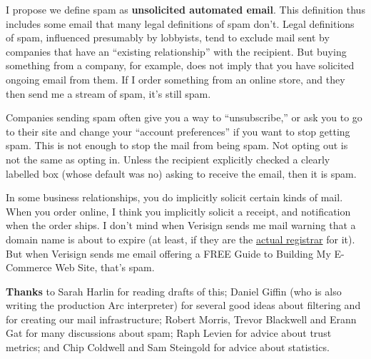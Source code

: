 I propose we define spam as \textbf{unsolicited automated email}. This
definition thus includes some email that many legal definitions of spam
don't. Legal definitions of spam, influenced presumably by lobbyists,
tend to exclude mail sent by companies that have an ``existing
relationship'' with the recipient. But buying something from a company,
for example, does not imply that you have solicited ongoing email from
them. If I order something from an online store, and they then send me a
stream of spam, it's still spam.

Companies sending spam often give you a way to ``unsubscribe,'' or ask
you to go to their site and change your ``account preferences'' if you
want to stop getting spam. This is not enough to stop the mail from
being spam. Not opting out is not the same as opting in. Unless the
recipient explicitly checked a clearly labelled box (whose default was
no) asking to receive the email, then it is spam.

In some business relationships, you do implicitly solicit certain kinds
of mail. When you order online, I think you implicitly solicit a
receipt, and notification when the order ships. I don't mind when
Verisign sends me mail warning that a domain name is about to expire (at
least, if they are the
\href{http://siliconvalley.internet.com/news/article.php/1441651}{actual
registrar} for it). But when Verisign sends me email offering a FREE
Guide to Building My E-Commerce Web Site, that's spam.

\textbf{Thanks} to Sarah Harlin for reading drafts of this; Daniel
Giffin (who is also writing the production Arc interpreter) for several
good ideas about filtering and for creating our mail infrastructure;
Robert Morris, Trevor Blackwell and Erann Gat for many discussions about
spam; Raph Levien for advice about trust metrics; and Chip Coldwell and
Sam Steingold for advice about statistics.